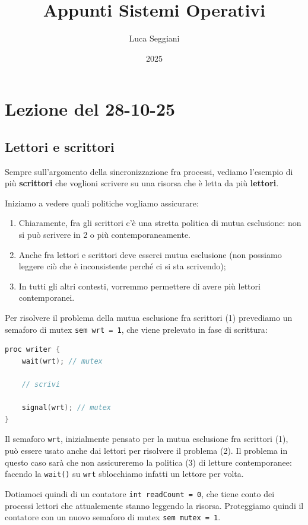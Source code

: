 \documentclass[a4paper,11pt]{article}
\title{Appunti Sistemi Operativi}
\author{Luca Seggiani}
\date{2025}
\begin{document}
\section{Lezione del 28-10-25}

\thispagestyle{empty}
\pagestyle{fancy}

\subsection{Lettori e scrittori}
Sempre sull'argomento della sincronizzazione fra processi, vediamo l'esempio di più \textbf{scrittori} che voglioni scrivere su una risorsa che è letta da più \textbf{lettori}.

Iniziamo a vedere quali politiche vogliamo assicurare:
\begin{enumerate}
	\item Chiaramente, fra gli scrittori c'è una stretta politica di mutua esclusione: non si può scrivere in 2 o più contemporaneamente.
	\item Anche fra lettori e scrittori deve esserci mutua esclusione (non possiamo leggere ciò che è inconsistente perché ci si sta scrivendo);
	\item In tutti gli altri contesti, vorremmo permettere di avere più lettori contemporanei.
\end{enumerate}

Per risolvere il problema della mutua esclusione fra scrittori (1) prevediamo un semaforo di mutex \lstinline|sem wrt = 1|, che viene prelevato in fase di scrittura:
\begin{lstlisting}[language=C++, style=codestyle]	
proc writer {
	wait(wrt); // mutex

	// scrivi

	signal(wrt); // mutex
}
\end{lstlisting}

Il semaforo \lstinline|wrt|, inizialmente pensato per la mutua esclusione fra scrittori (1), può essere usato anche dai lettori per risolvere il problema (2).
Il problema in questo caso sarà che non assicureremo la politica (3) di letture contemporanee: facendo la \lstinline|wait()| su \lstinline|wrt| sblocchiamo infatti un lettore per volta.

Dotiamoci quindi di un contatore \lstinline|int readCount = 0|, che tiene conto dei processi lettori che attualemente stanno leggendo la risorsa.
Proteggiamo quindi il contatore con un nuovo semaforo di mutex \lstinline|sem mutex = 1|.
\end{document}
